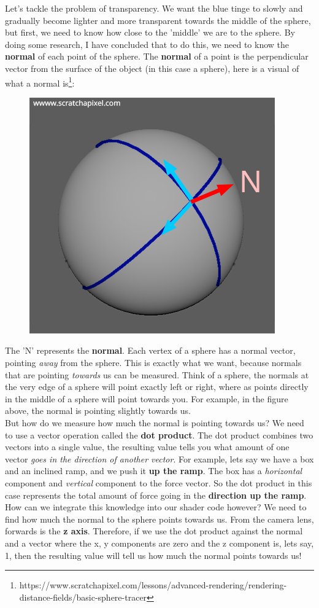 Let's tackle the problem of transparency. We want the blue tinge to slowly and gradually become lighter and more transparent towards the middle of the sphere, but first, we need to know how close to the 'middle' we are to the sphere. By doing some research, I have concluded that to do this, we need to know the \textbf{normal} of each point of the sphere. The \textbf{normal} of a point is the perpendicular vector from the surface of the object (in this case a sphere), here is a visual of what a normal is\footnote{https://www.scratchapixel.com/lessons/advanced-rendering/rendering-distance-fields/basic-sphere-tracer}: \\
\begin{figure}[h]
\centering
\includegraphics[width=0.2\linewidth]{images/screenshot004}
\caption{}
\label{fig:screenshot004}
\end{figure}
The 'N' represents the \textbf{normal}. Each vertex of a sphere has a normal vector, pointing \textit{away} from the sphere. This is exactly what we want, because normals that are pointing \textit{towards} us can be measured. Think of a sphere, the normals at the very edge of a sphere will point exactly left or right, where as points directly in the middle of a sphere will point towards you. For example, in the figure above, the normal is pointing slightly towards us. \\
But how do we measure how much the normal is pointing towards us? We need to use a vector operation called the \textbf{dot product}. The dot product combines two vectors into a single value, the resulting value tells you what amount of one vector \textit{goes in the direction of another vector}. For example, lets say we have a box and an inclined ramp, and we push it \textbf{up the ramp}. The box has a \textit{horizontal} component and \textit{vertical} component to the force vector. So the dot product in this case represents the total amount of force going in the \textbf{direction up the ramp}. \\
How can we integrate this knowledge into our shader code however? We need to find how much the normal to the sphere points towards us. From the camera lens, forwards is the \textbf{z axis}. Therefore, if we use the dot product against the normal and a vector where the x, y components are zero and the z component is, lets say, 1, then the resulting value will tell us how much the normal points towards us!
